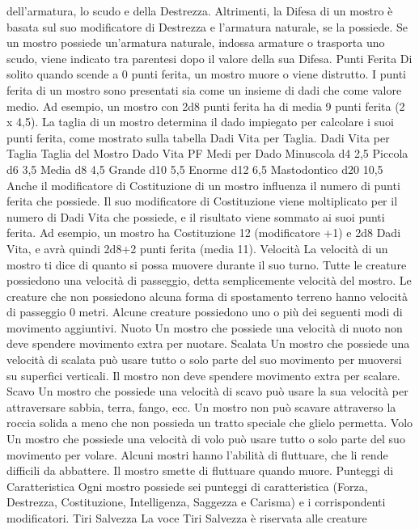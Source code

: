 \begin{multicols}{2}
dell’armatura, lo scudo e della Destrezza. Altrimenti, la
Difesa di un mostro è basata sul suo modificatore di
Destrezza e l’armatura naturale, se la possiede. Se un
mostro possiede un’armatura naturale, indossa
armature o trasporta uno scudo, viene indicato tra
parentesi dopo il valore della sua Difesa.
Punti Ferita
Di solito quando scende a 0 punti ferita, un mostro
muore o viene distrutto.
I punti ferita di un mostro sono presentati sia come un
insieme di dadi che come valore medio. Ad esempio,
un mostro con 2d8 punti ferita ha di media 9 punti ferita
(2 x 4,5).
La taglia di un mostro determina il dado impiegato per
calcolare i suoi punti ferita, come mostrato sulla tabella
Dadi Vita per Taglia.
Dadi Vita per Taglia
Taglia del Mostro Dado Vita PF Medi per Dado
Minuscola d4 2,5
Piccola d6 3,5
Media d8 4,5
Grande d10 5,5
Enorme d12 6,5
Mastodontico d20 10,5
Anche il modificatore di Costituzione di un mostro
influenza il numero di punti ferita che possiede. Il suo
modificatore di Costituzione viene moltiplicato per il
numero di Dadi Vita che possiede, e il risultato viene
sommato ai suoi punti ferita. Ad esempio, un mostro ha
Costituzione 12 (modificatore +1) e 2d8 Dadi Vita, e
avrà quindi 2d8+2 punti ferita (media 11).
Velocità
La velocità di un mostro ti dice di quanto si possa
muovere durante il suo turno.
Tutte le creature possiedono una velocità di passeggio,
detta semplicemente velocità del mostro. Le creature
che non possiedono alcuna forma di spostamento
terreno hanno velocità di passeggio 0 metri.
Alcune creature possiedono uno o più dei seguenti
modi di movimento aggiuntivi.
Nuoto
Un mostro che possiede una velocità di nuoto non deve
spendere movimento extra per nuotare.
Scalata
Un mostro che possiede una velocità di scalata può
usare tutto o solo parte del suo movimento per
muoversi su superfici verticali. Il mostro non deve
spendere movimento extra per scalare.
Scavo
Un mostro che possiede una velocità di scavo può
usare la sua velocità per attraversare sabbia, terra,
fango, ecc. Un mostro non può scavare attraverso la
roccia solida a meno che non possieda un tratto
speciale che glielo permetta.
Volo
Un mostro che possiede una velocità di volo può usare
tutto o solo parte del suo movimento per volare. Alcuni
mostri hanno l’abilità di fluttuare, che li rende difficili da
abbattere. Il mostro smette di fluttuare quando muore.
Punteggi di Caratteristica
Ogni mostro possiede sei punteggi di caratteristica
(Forza, Destrezza, Costituzione, Intelligenza, Saggezza
e Carisma) e i corrispondenti modificatori.
Tiri Salvezza
La voce Tiri Salvezza è riservata alle creature

\end{multicols}
